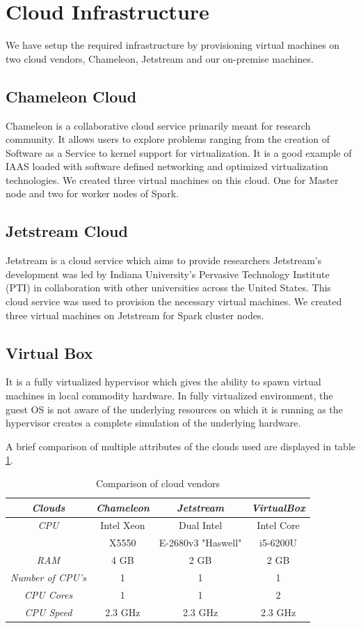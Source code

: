 \documentclass[9pt,twocolumn,twoside]{../../styles/osajnl}
\begin{document}
\section{Cloud Infrastructure}
We have setup the required infrastructure by provisioning virtual machines on two cloud vendors, Chameleon, Jetstream and our on-premise machines.
\subsection{Chameleon Cloud}
Chameleon  is a collaborative cloud service primarily meant for research community. It allows users to explore problems ranging from the creation of Software as a Service to kernel support for virtualization. It is a good example of IAAS loaded with software defined networking and optimized virtualization technologies. We created three virtual machines on this cloud. One for Master node and two for worker nodes of Spark.

\subsection{Jetstream Cloud}
Jetstream is a cloud service which aims to provide researchers Jetstream’s development was led by Indiana University’s Pervasive Technology Institute (PTI) in collaboration with other universities \cite{www-jetstream} across the United States. This cloud service was used to provision the necessary virtual machines. We created three virtual machines on Jetstream for Spark cluster nodes.

\subsection{Virtual Box}
It is a fully virtualized hypervisor which gives the ability to spawn virtual machines in local commodity hardware. In fully virtualized environment, the guest OS  is not aware of the underlying  resources on which it is running as the hypervisor creates a complete simulation of the underlying hardware. 

A brief comparison of multiple attributes of the clouds used are displayed in table \ref{table:clouds}.

\begin{table}[h!]
\centering
 \begin{tabular}{|c|c c c|} 
 \hline
 \textit{Clouds} & \textit{Chameleon} & \textit{Jetstream} & \textit{VirtualBox}  \\ 
 \hline
 \hline 
 \textit{CPU} & Intel Xeon & Dual Intel & Intel Core  \\ 
 & X5550 & E-2680v3 "Haswell" & i5-6200U\\
 \hline 
 \textit{RAM} & 4 GB & 2 GB & 2 GB \\ 
\hline 
\textit{Number of CPU's} & 1 & 1 & 1 \\
\hline 
\textit{CPU Cores} & 1 & 1 & 2\\
\hline 
\textit{CPU Speed} & 2.3 GHz & 2.3 GHz & 2.3 GHz\\
\hline 
\end{tabular}
\caption{Comparison of cloud vendors}
\label{table:clouds}
\end{table}
\end{document}
